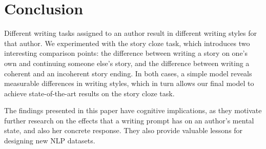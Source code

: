 \documentclass[11pt,a4paper]{article}
\newcommand{\isectionb}[1]{\section{#1}\label{ssec:#1}}
\newcommand{\resolved}[1]{}
\newcommand{\shortv}[1]{}
\newcommand{\nascomment}[1]{{\color{blue}\textsc{[#1 --nas]}}}
\renewcommand{\nascomment}[1]{}
\begin{document}
\isectionb{Conclusion}

Different writing tasks assigned to an author result in different
writing styles for that author.
We experimented with the story cloze task, which introduces two interesting comparison points: %
 the difference between writing a story on one's own and continuing someone else's story,
 and the difference between writing a coherent and an incoherent story ending.
In both cases, a simple \shortv{linear }model reveals measurable differences in writing styles, %
which in turn allows our final 
model to achieve state-of-the-art results on the story cloze task.

The findings presented in this paper have  cognitive implications, as
they motivate further research on the effects that a writing
prompt has on an author's mental state, and also her concrete response.
They also provide valuable lessons for designing new NLP datasets.
 \resolved{\nascomment{drop the last sentence, it makes this paper seem less
  complete} Future work will include testing whether other similar writing tasks, such as fake news, also impose their own unique and identifiable style on their authors.}




%
%



\end{document}
